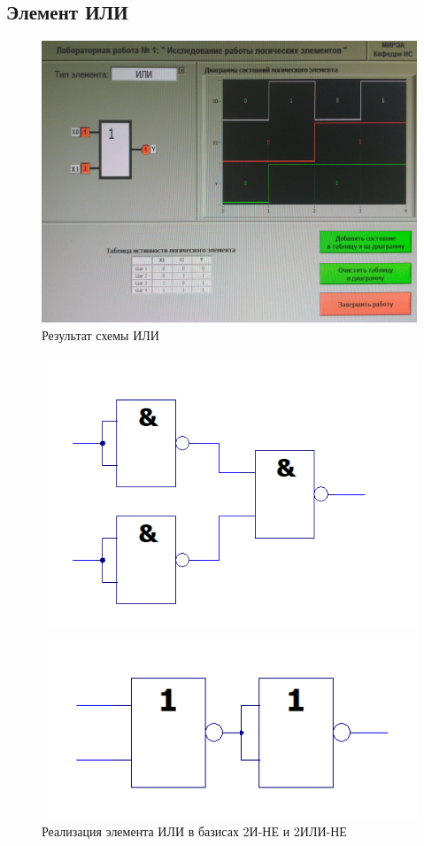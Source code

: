 \subsection{Элемент ИЛИ}

\begin{figure}[H]
	\centering
	\includegraphics[width=0.85\linewidth]{imgs/1/or}
	\caption{Результат схемы ИЛИ}
	\label{fig:1_or}
\end{figure}

\begin{figure}[H]
	\centering
	\begin{minipage}{.45\textwidth}
		\centering
		\includegraphics[width=0.85\linewidth]{imgs/1/or_and}
	\end{minipage}
	\begin{minipage}{.45\textwidth}
		\centering
		\includegraphics[width=0.85\linewidth]{imgs/1/or_or}
	\end{minipage}
	\caption{Реализация элемента ИЛИ в базисах 2И-НЕ и 2ИЛИ-НЕ}
\end{figure}

